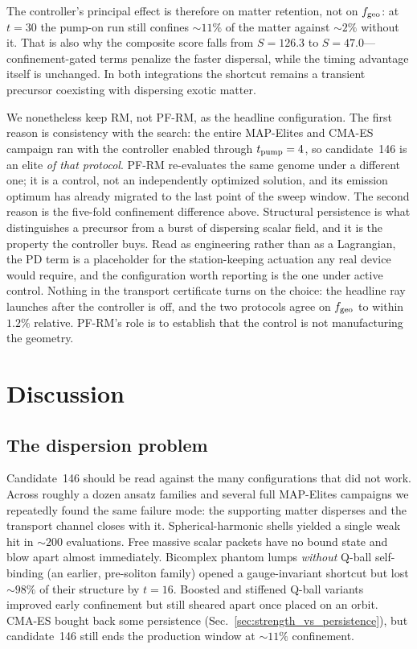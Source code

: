 \documentclass[twocolumn,floatfix,aps,prd,nofootinbib]{revtex4-2}
\begin{document}
The controller's principal effect is therefore on matter retention, not on
$f_{\rm geo}$: at $t=30$ the pump-on run still confines ${\sim}11\%$ of the
matter against ${\sim}2\%$ without it. That is also why the composite score
falls from $S=126.3$ to $S=47.0$---confinement-gated terms penalize the faster
dispersal, while the timing advantage itself is unchanged. In both
integrations the shortcut remains a transient precursor coexisting with
dispersing exotic matter.

We nonetheless keep RM, not PF-RM, as the headline configuration. The first
reason is consistency with the search: the entire MAP-Elites and CMA-ES
campaign ran with the controller enabled through $t_{\rm pump}=4$, so
candidate~146 is an elite \emph{of that protocol}. PF-RM re-evaluates the same
genome under a different one; it is a control, not an independently optimized
solution, and its emission optimum has already migrated to the last point of
the sweep window. The second reason is the five-fold confinement difference
above. Structural persistence is what distinguishes a precursor from a burst of
dispersing scalar field, and it is the property the controller buys. Read as
engineering rather than as a Lagrangian, the PD term is a placeholder for the
station-keeping actuation any real device would require, and the configuration
worth reporting is the one under active control. Nothing in the transport
certificate turns on the choice: the headline ray launches after the controller
is off, and the two protocols agree on $f_{\rm geo}$ to within $1.2\%$
relative. PF-RM's role is to establish that the control is not manufacturing
the geometry.


\section{Discussion}
\label{sec:discussion}

\subsection{The dispersion problem}
\label{sec:dispersion}

Candidate~146 should be read against the many configurations that did not work.
Across roughly a dozen ansatz families and several full MAP-Elites campaigns we
repeatedly found the same failure mode: the supporting matter disperses and the
transport channel closes with it. Spherical-harmonic shells yielded a single
weak hit in ${\sim}\!200$ evaluations. Free massive scalar packets have no bound
state and blow apart almost immediately. Bicomplex phantom lumps \emph{without}
Q-ball self-binding (an earlier, pre-soliton family) opened a
gauge-invariant shortcut but lost ${\sim}\!98\%$ of their structure by $t=16$.
Boosted and stiffened Q-ball variants improved early confinement but still
sheared apart once placed on an orbit. CMA-ES bought back some persistence
(Sec.~\ref{sec:strength_vs_persistence}), but candidate~146 still ends the
production window at ${\sim}11\%$ confinement.
\end{document}
